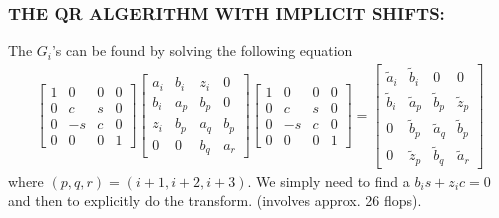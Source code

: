 \documentclass[a4paper,8pt]{beamer} %
\newcommand{\smatrix}[1]{\left[\begin{matrix} #1 \end{matrix}\right]}
\begin{document}
\begin{frame} \frametitle{THE QR ALGERITHM WITH IMPLICIT SHIFTS:} %
		The $G_i$'s can be found by solving the following equation
		\begin{align}
			\smatrix{
				1 & 0 & 0 & 0 \\
				0 & c & s & 0 \\
				0 & -s & c & 0 \\
				0 & 0 & 0 & 1 
			}
			\smatrix{
				a_i& b_i & z_i & 0 \\
				b_i & a_p & b_p & 0 \\
				z_i & b_p & a_q & b_p \\
				0 & 0 & b_q & a_r 
			}
			\smatrix{
				1 & 0 & 0 & 0 \\
				0 & c & s & 0 \\
				0 & -s & c & 0 \\
				0 & 0 & 0 & 1 
			}
			=
			\smatrix{
				\tilde a_i& \tilde b_i & 0 & 0 \\
				\tilde b_i &\tilde a_p &\tilde b_p &\tilde z_p \\
				0 &\tilde b_p &\tilde a_q &\tilde b_p \\
				0 &\tilde z_p &\tilde b_q &\tilde a_r 
			}
		\end{align}
		where $(p,q,r)=(i+1, i+2, i+3)$. We simply need to find a $b_is+z_ic = 0$
		and then to explicitly do the transform. (involves approx. 26 flops).
	\end{frame}%
\end{document}
